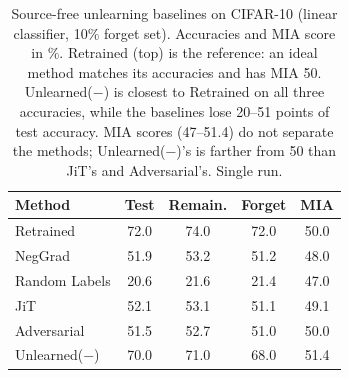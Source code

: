 \begin{table}[t]
  \centering
  \small
  \setlength{\tabcolsep}{4pt}
  \begin{tabular}{@{}lcccc@{}}
    \toprule
    Method & Test & Remain. & Forget & MIA \\
    \midrule
    Retrained & 72.0 & 74.0 & 72.0 & 50.0 \\
    \midrule
    NegGrad & 51.9 & 53.2 & 51.2 & 48.0 \\
    Random Labels & 20.6 & 21.6 & 21.4 & 47.0 \\
    JiT & 52.1 & 53.1 & 51.1 & 49.1 \\
    Adversarial & 51.5 & 52.7 & 51.0 & 50.0 \\
    \midrule
    Unlearned($-$) & 70.0 & 71.0 & 68.0 & 51.4 \\
    \bottomrule
  \end{tabular}
  \caption{Source-free unlearning baselines on CIFAR-10 (linear classifier, 10\% forget set). Accuracies and MIA score in \%. Retrained (top) is the reference: an ideal method matches its accuracies and has MIA 50. Unlearned($-$) is closest to Retrained on all three accuracies, while the baselines lose 20--51 points of test accuracy. MIA scores (47--51.4) do not separate the methods; Unlearned($-$)'s is farther from 50 than JiT's and Adversarial's. Single run.}
  \label{tab:baselines}
\end{table}
